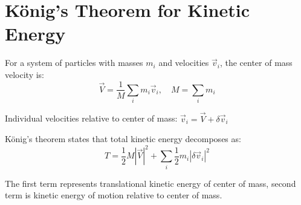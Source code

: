 \documentclass{article}
\begin{document}
\section*{König's Theorem for Kinetic Energy}

For a system of particles with masses $m_i$ and velocities $\vec{v}_i$, the center of mass velocity is:
\[
\vec{V} = \frac{1}{M}\sum_i m_i\vec{v}_i, \quad M = \sum_i m_i
\]

Individual velocities relative to center of mass: $\vec{v}_i = \vec{V} + \delta\vec{v}_i$

König's theorem states that total kinetic energy decomposes as:
\[
T = \frac{1}{2}M|\vec{V}|^2 + \sum_i \frac{1}{2}m_i|\delta\vec{v}_i|^2
\]

The first term represents translational kinetic energy of center of mass, second term is kinetic energy of motion relative to center of mass.
\end{document}
